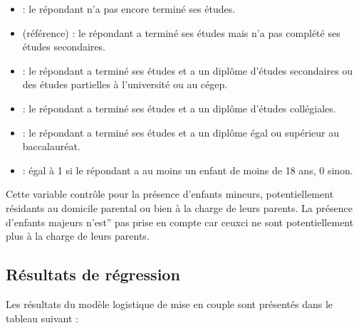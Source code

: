 \documentclass[letterpaper,10pt,french]{sphinxmanual}
\begin{document}
\begin{itemize}
\item {} 
 : le répondant n’a pas encore terminé ses études.

\item {} 
 (référence) : le répondant a terminé ses études mais n’a pas complété ses études secondaires.

\item {} 
 : le répondant a terminé ses études et a un diplôme d’études secondaires ou des études partielles à l’université ou au cégep.

\item {} 
 : le répondant a terminé ses études et a un diplôme d’études collégiales.

\item {} 
 : le répondant a terminé ses études et a un diplôme égal ou supérieur au baccalauréat.

\end{itemize}

\begin{itemize}
\item {} 
 : égal à 1 si le répondant a au moins un enfant de moins de 18 ans, 0 sinon.

\end{itemize}

Cette variable contrôle pour la présence d’enfants mineurs, potentiellement résidants au domicile parental ou bien à la charge de leurs parents. La présence d’enfants majeurs n’est” pas prise en compte car ceux\sphinxhyphen{}ci ne sont potentiellement plus à la charge de leurs parents.


\subsection{Résultats de régression}
\label{\detokenize{methodologie:id11}}
Les résultats du modèle logistique de mise en couple sont présentés dans le tableau suivant :
\end{document}
